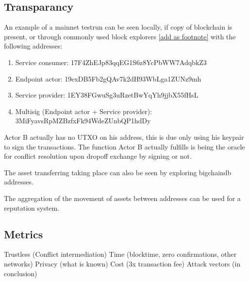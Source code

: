 \subsection{Transparancy}

An example of a mainnet testrun can be seen locally, if copy of blockchain is present, or through commonly used block explorers \href{https://www.blocktrail.com/BTC}{[add as footnote]}
 with the following addresses:
\begin{enumerate}
  \item Service consumer: 17F4ZhEJp83qqEG1S6z8YcPbWW7AdqbkZ3
  \item Endpoint actor: 19exDB5Fb2gQAv7k2dH93WbLga1ZUNz9mh
  \item Service provider: 1EY38FGwuSg3uRzetBwYqYh9jjbX55fHsL
  \item Multisig (Endpoint actor + Service provider): 3MiFyavsRpMZBzfxFk94WdeZUnbQP1hdDy
\end{enumerate}

Actor B actually has no UTXO on his address, this is due only using his keypair to sign the transactions. The function Actor B actually fulfills is being the oracle for conflict resolution upon dropoff exchange by signing or not.\par
The asset transferring taking place can also be seen by exploring bigchaindb addresses. \par
The aggregation of the movement of assets between addresses can be used for a reputation system.

\subsection{Metrics}

Trustless (Conflict intermediation)
Time (blocktime, zero confirmations, other networks)
Privacy (what is known)
Cost (3x transaction fee)
Attack vectors (in conclusion)


%
